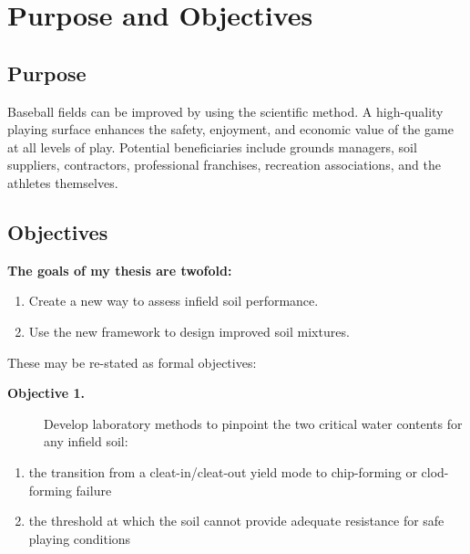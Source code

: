 \documentclass[
  letterpaper,
  openany]{book}
\providecommand{\tightlist}{%
  \setlength{\itemsep}{0pt}\setlength{\parskip}{0pt}}
\begin{document}
\listoffigures


\listoftables

\linenumbers

\hypertarget{purpose-and-objectives}{%
\chapter{Purpose and Objectives}\label{purpose-and-objectives}}

\hypertarget{purpose}{%
\section{Purpose}\label{purpose}}

Baseball fields can be improved by using the scientific method.
A high-quality playing surface enhances the safety, enjoyment, and economic value of the game at all levels of play.
Potential beneficiaries include grounds managers, soil suppliers, contractors, professional franchises, recreation associations, and the athletes themselves.

\hypertarget{objectives}{%
\section{Objectives}\label{objectives}}

\textbf{The goals of my thesis are twofold:}

\begin{enumerate}
\def\labelenumi{\arabic{enumi}.}
\tightlist
\item
  Create a new way to assess infield soil performance.
\item
  Use the new framework to design improved soil mixtures.
\end{enumerate}

These may be re-stated as formal objectives:

\begin{description}
\item[\textbf{Objective 1.}]
Develop laboratory methods to pinpoint the two critical water contents for any infield soil:
\end{description}

\begin{enumerate}
\def\labelenumi{\alph{enumi})}
\item
  the transition from a cleat-in/cleat-out yield mode to chip-forming or clod-forming failure
\item
  the threshold at which the soil cannot provide adequate resistance for safe playing conditions
\end{enumerate}
\end{document}
